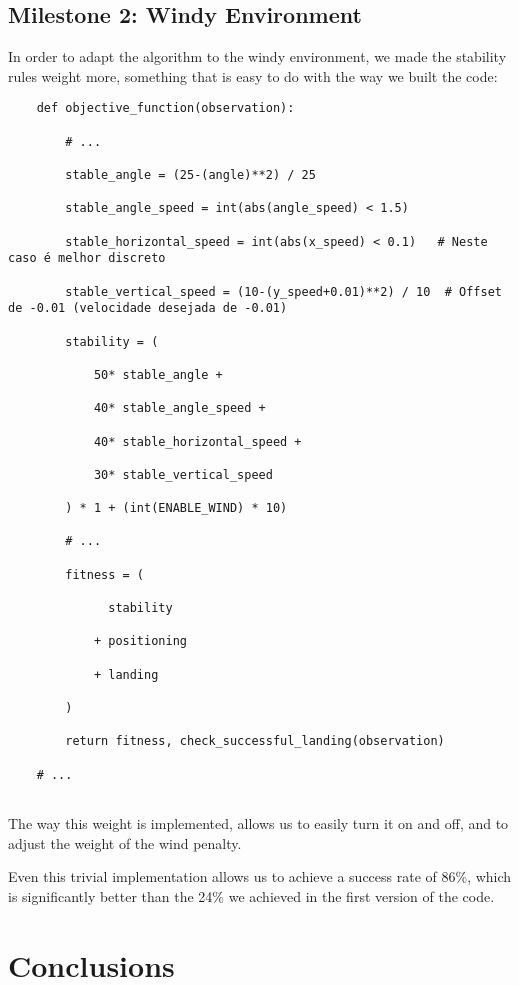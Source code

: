 \documentclass{article}
\begin{document}
\subsection{Milestone 2: Windy Environment}
In order to adapt the algorithm to the windy environment, we made the stability rules weight more, something that is easy to do with the way we built the code:
\begin{lstlisting}
    def objective_function(observation):

        # ...

        stable_angle = (25-(angle)**2) / 25

        stable_angle_speed = int(abs(angle_speed) < 1.5)

        stable_horizontal_speed = int(abs(x_speed) < 0.1)   # Neste caso é melhor discreto

        stable_vertical_speed = (10-(y_speed+0.01)**2) / 10  # Offset de -0.01 (velocidade desejada de -0.01)

        stability = (

            50* stable_angle +

            40* stable_angle_speed +

            40* stable_horizontal_speed +

            30* stable_vertical_speed

        ) * 1 + (int(ENABLE_WIND) * 10)

        # ...

        fitness = (

              stability

            + positioning

            + landing

        )

        return fitness, check_successful_landing(observation)

    # ...


\end{lstlisting}


The way this weight is implemented, allows us to easily turn it on and off, and to adjust the weight of the wind penalty.


Even this trivial implementation allows us to achieve a success rate of 86\%, which is significantly better than the 24\% we achieved in the first version of the code.


\section{Conclusions}
\end{document}

